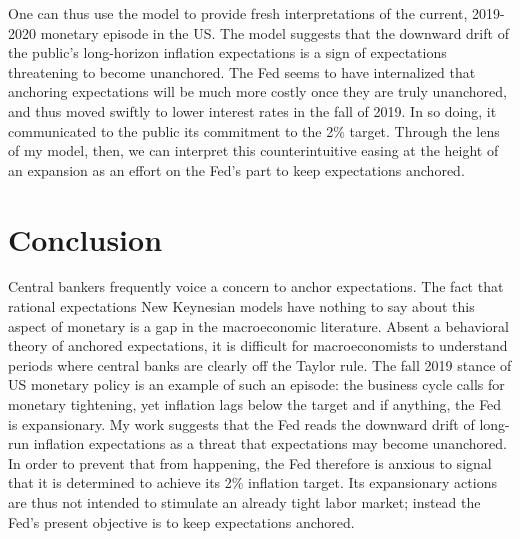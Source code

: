 \documentclass[11pt]{article}
\def \myBibPath {../../literature/}
\renewcommand{\[}{\begin{equation}}
\renewcommand{\]}{\end{equation}}
\begin{document}
One can thus use the model to provide fresh interpretations of the current, 2019-2020 monetary episode in the US. The model suggests that the downward drift of the public's long-horizon inflation expectations is a sign of expectations threatening to become unanchored. The Fed seems to have internalized that anchoring expectations will be much more costly once they are truly unanchored, and thus moved swiftly to lower interest rates in the fall of 2019. In so doing, it communicated to the public its commitment to the 2\% target. Through the lens of my model, then, we can interpret this counterintuitive easing at the height of an expansion as an effort on the Fed's part to keep expectations anchored. 






\section{Conclusion}\label{conclusion}
Central bankers frequently voice a concern to anchor expectations. The fact that rational expectations New Keynesian models have nothing to say about this aspect of monetary is a gap in the macroeconomic literature. Absent a behavioral theory of anchored expectations, it is difficult for macroeconomists to understand periods where central banks are clearly off the Taylor rule. The fall 2019 stance of US monetary policy is an example of such an episode: the business cycle calls for monetary tightening, yet inflation lags below the target and if anything, the Fed is expansionary. My work suggests that the Fed reads the downward drift of long-run inflation expectations as a threat that expectations may become unanchored. In order to prevent that from happening, the Fed therefore is anxious to signal that it is determined to achieve its 2\% inflation target. Its expansionary actions are thus not intended to stimulate an already tight labor market; instead the Fed's present objective is to keep expectations anchored. 


\clearpage
\newpage

%


\newpage
\appendix
\end{document}
